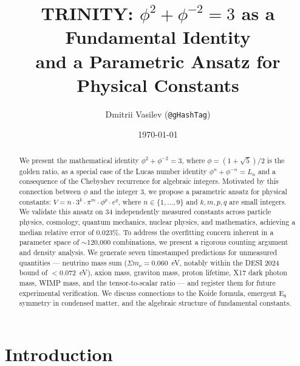 \documentclass[aps,prd,preprint,superscriptaddress,showpacs,nofootinbib,longbibliography]{revtex4-2}
\begin{document}
\title{TRINITY: $\phi^2 + \phi^{-2} = 3$ as a Fundamental Identity\\
and a Parametric Ansatz for Physical Constants}

\author{Dmitrii Vasilev (\texttt{@gHashTag})}

\date{\today}

\begin{abstract}
We present the mathematical identity $\phi^2 + \phi^{-2} = 3$, where $\phi = (1+\sqrt{5})/2$ is the golden ratio, as a special case of the Lucas number identity $\phi^n + \phi^{-n} = L_n$ and a consequence of the Chebyshev recurrence for algebraic integers. Motivated by this connection between $\phi$ and the integer $3$, we propose a parametric ansatz for physical constants: $V = n \cdot 3^k \cdot \pi^m \cdot \phi^p \cdot e^q$, where $n \in \{1,\ldots,9\}$ and $k,m,p,q$ are small integers. We validate this ansatz on 34 independently measured constants across particle physics, cosmology, quantum mechanics, nuclear physics, and mathematics, achieving a median relative error of 0.023\%. To address the overfitting concern inherent in a parameter space of $\sim$120,000 combinations, we present a rigorous counting argument and density analysis. We generate seven timestamped predictions for unmeasured quantities --- neutrino mass sum ($\Sigma m_\nu = 0.060$~eV, notably within the DESI 2024 bound of $<$0.072~eV), axion mass, graviton mass, proton lifetime, X17 dark photon mass, WIMP mass, and the tensor-to-scalar ratio --- and register them for future experimental verification. We discuss connections to the Koide formula, emergent E$_8$ symmetry in condensed matter, and the algebraic structure of fundamental constants.
\end{abstract}



\maketitle

\section{Introduction}
\label{sec:intro}
\end{document}
